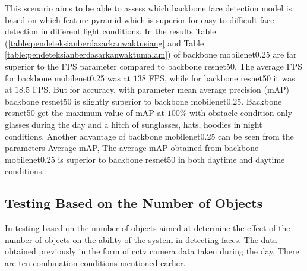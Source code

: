 This scenario aims to be able to assess which backbone face detection model is based on which feature pyramid
which is superior for easy to difficult face detection in different light conditions.
In the results Table (\ref{table:pendeteksianberdasarkanwaktusiang} and Table \ref{table:pendeteksianberdasarkanwaktumalam}) of backbone mobilenet0.25 are far superior to the FPS parameter
compared to backbone resnet50. The average FPS for backbone mobilenet0.25 was at $138$ FPS, while for backbone resnet50 it was at $18.5$ FPS. But for accuracy, with parameter 
mean average precision (mAP) backbone resnet50 is slightly superior to backbone mobilenet0.25. Backbone resnet50 get the maximum value of mAP at $100\%$ with obstacle condition
only glasses during the day and a hitch of sunglasses, hats, hoodies in night conditions. Another advantage of backbone mobilenet0.25 can be seen from the parameters
Average mAP, The average mAP obtained from backbone mobilenet0.25 is superior to backbone resnet50 in both daytime and daytime conditions.

\subsection{Testing Based on the Number of Objects}

In testing based on the number of objects aimed at
determine the effect of the number of objects on the ability of the system
in detecting faces. The data obtained previously in the form of cctv camera data taken
during the day. There are ten combination conditions mentioned earlier.

